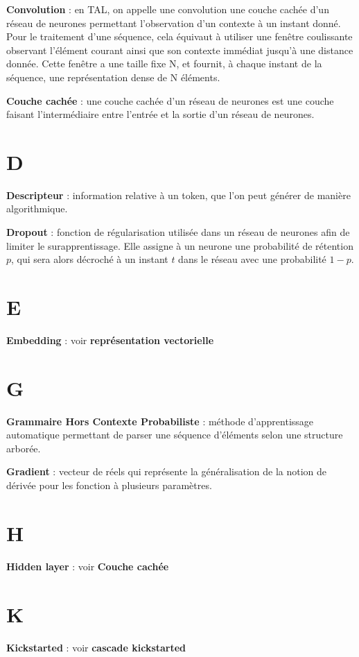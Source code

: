 \documentclass[12pt,a4paper,times,twoside,openright]{report}
\begin{document}
\textbf{Convolution} : en TAL, on appelle une convolution une couche cachée d'un réseau de neurones permettant l'observation d'un contexte à un instant donné. Pour le traitement d'une séquence, cela équivaut à utiliser une fenêtre coulissante observant l'élément courant ainsi que son contexte immédiat jusqu'à une distance donnée. Cette fenêtre a une taille fixe N, et fournit, à chaque instant de la séquence, une représentation dense de N éléments.

\textbf{Couche cachée} : une couche cachée d'un réseau de neurones est une couche faisant l'intermédiaire entre l'entrée et la sortie d'un réseau de neurones.

\section*{D}
\textbf{Descripteur} : information relative à un token, que l'on peut générer de manière algorithmique.

\textbf{Dropout} : fonction de régularisation utilisée dans un réseau de neurones afin de limiter le surapprentissage. Elle assigne à un neurone une probabilité de rétention $p$, qui sera alors décroché à un instant $t$ dans le réseau avec une probabilité $1-p$.

\section*{E}
\textbf{Embedding} : voir \textbf{représentation vectorielle}

\section*{G}
\textbf{Grammaire Hors Contexte Probabiliste} : méthode d'apprentissage automatique permettant de parser une séquence d'éléments selon une structure arborée.

\textbf{Gradient} : vecteur de réels qui représente la généralisation de la notion de dérivée pour les fonction à plusieurs paramètres.

\section*{H}
\textbf{Hidden layer} : voir \textbf{Couche cachée}

\section*{K}
\textbf{Kickstarted} : voir \textbf{cascade kickstarted}
\end{document}
